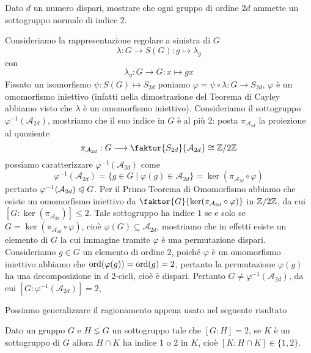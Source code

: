 \documentclass[11pt]{scrartcl}
\begin{document}
\begin{exercise}
    Dato $d$ un numero dispari, mostrare che ogni gruppo di ordine $2d$ ammette
    un sottogruppo normale di indice 2.
\end{exercise}

\begin{soln}
    Consideriamo la rappresentazione regolare a sinistra di $G$
    \[
        \lambda: G \longrightarrow S(G) : g\longmapsto \lambda_g
    \]
    con
    \[
        \lambda_g : G\longrightarrow G : x\longmapsto gx
    \]
    Fissato un isomorfismo $\psi: S(G) \longmapsto S_{2d}$ poniamo
    $\varphi = \psi\circ\lambda :G\longrightarrow S_{2d}$, $\varphi$ è 
    un omomorfismo iniettivo (infatti nella dimostrazione del Teorema di Cayley
    abbiamo visto che $\lambda$ è un omomorfismo iniettivo). Consideriamo 
    il sottogruppo $\varphi^{-1}(\mathcal{A}_{2d})$, mostriamo che il suo 
    indice in $G$ è al più 2:
    posta $\pi_{\mathcal{A}_{2d}}$ la proiezione al quoziente
    \[
        \pi_{\mathcal{A}_{2d}}:G\longrightarrow \faktor{S_{2d}}{\mathcal{A}_{2d}}\cong \Z2
    \]
    possiamo caratterizzare $\varphi^{-1}(\mathcal{A}_{2d})$ come
    \[
        \varphi^{-1}(\mathcal{A}_{2d}) = \{g \in G \mid \varphi(g) \in \mathcal{A}_{2d}\}
        = \ker (\pi_{\mathcal{A}_{2d}}\circ\varphi)
    \]
    pertanto $\varphi^{-1}(\mathcal{A}_{2d})\trianglelefteqslant G$. 
    Per il Primo Teorema di Omomorfismo abbiamo che esiste un omomorfismo
    iniettivo da $\faktor{G}{\ker(\pi_{\mathcal{A}_{2d}}\circ\varphi)}$ in
    $\mathbb{Z}/{2}\mathbb{Z}$, da cui $[G:\ker(\pi_{\mathcal{A}_{2d}})] \leqslant 2$. Tale 
    sottogruppo ha indice 1 se e solo se $G = \ker(\pi_{\mathcal{A}_{2d}}\circ\varphi)$,
    cioè $\varphi(G) \subseteq \mathcal{A}_{2d}$, mostriamo che in effetti esiste 
    un elemento di $G$ la cui immagine tramite $\varphi$ è una permutazione 
    dispari. Consideriamo $g \in G$ un elemento di ordine 2, poiché $\varphi$
    è un omomorfismo iniettivo abbiamo che $\operatorname{ord}(\varphi(g)) = \operatorname{ord}(g) = 2$,
    pertanto la permutazione $\varphi(g)$ ha una decomposizione in $d$ 2-cicli,
    cioè è dispari. Pertanto $G \neq \varphi^{-1}(\mathcal{A}_{2d})$,
    da cui $[G: \varphi^{-1}(\mathcal{A}_{2d})] = 2$,
\end{soln}

Possiamo generalizzare il ragionamento appena usato nel seguente risultato

\begin{proposition}
    Dato un gruppo $G$ e $H\lneq G$ un sottogruppo tale che $[G:H] = 2$, se
    $K$ è un sottogruppo di $G$ allora $H\cap K$ ha indice 1 o 2 in $K$,
    cioè $[K:H\cap K] \in \{1, 2\}$.
\end{proposition}
\end{document}
